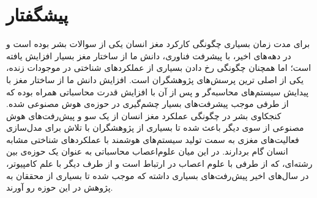 \documentclass[12pt]{report}
\begin{document}
	
	\onehalfspacing
	
	\chapter*{پیشگفتار }
	برای مدت زمان بسیاری چگونگی کارکرد مغز انسان یکی از سوالات بشر بوده است و در دهه‌های اخیر، با پیشرفت فناوری، دانش ما از ساختار مغز بسیار افزایش یافته‌ است؛ اما همچنان چگونگی رخ دادن بسیاری از عملکرد‌های شناختی در موجودات زنده، یکی از اصلی ترین پرسش‌های پژوهشگران است. افزایش دانش ما از ساختار مغز با پیدایش سیستم‌های محاسبه‌گر و پس از آن با افزایش قدرت محاسباتی همراه بوده که از طرفی موجب پیشرفت‌های بسیار چشم‌گیری در حوزه‌ی هوش مصنوعی شده. کنجکاوی بشر در چگونگی عملکرد مغز انسان از یک سو و پیش‌رفت‌های هوش مصنوعی از سوی دیگر باعث شده تا بسیاری از پژوهشگران با تلاش برای مدل‌سازی فعالیت‌های مغزی به سمت تولید سیستم‌های هوشمند با عملکرد‌های شناختی مشابه انسان گام بردارند. در این میان علوم‌اعصاب محاسباتی به عنوان یک حوزه‌ی بین رشته‌ای، که از طرفی با علوم اعصاب در ارتباط است و از طرف دیگر با علم کامپیوتر، در سال‌های اخیر پیش‌رفت‌های بسیاری داشته که موجب شده تا بسیاری از محققان به پژوهش در این حوزه رو آورند.
	
\end{document}
